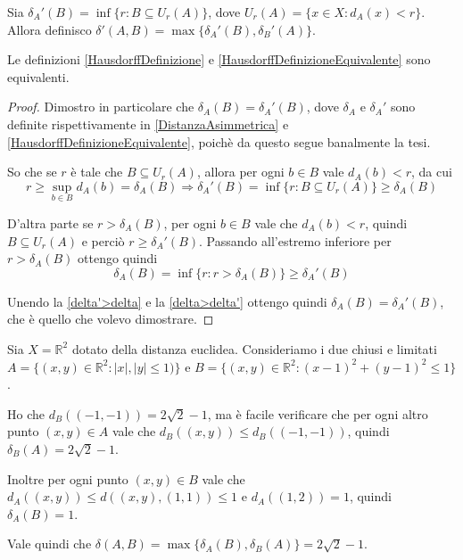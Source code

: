 \begin{definition} \label{HausdorffDefinizioneEquivalente}
	Sia $\delta_A'(B)=\inf\{r:B\subseteq U_r(A)\}$, dove $U_r(A)=\{x\in X : d_A(x)< r \}$. Allora definisco $\delta'(A,B)=\max\{\delta_A'(B),\delta_B'(A)\}$.
\end{definition}

\begin{theorem}
	Le definizioni \cref{HausdorffDefinizione} e \cref{HausdorffDefinizioneEquivalente} sono equivalenti.
\end{theorem}
\begin{proof}
	Dimostro in particolare che $\delta_A(B)=\delta_A'(B)$, dove $\delta_A$ e $\delta_A'$ sono definite rispettivamente in \cref{DistanzaAsimmetrica} e \cref{HausdorffDefinizioneEquivalente}, poichè da questo segue banalmente la tesi.
	
	So che se $r$ è tale che $B\subseteq U_r(A)$, allora per ogni $b\in B$ vale $d_A(b)<r$, da cui
	\begin{equation}\label{delta'>delta}
		r\ge \sup_{b\in B} d_A(b)=\delta_A(B) \Longrightarrow \delta_A'(B)=\inf\{r:B\subseteq U_r(A) \}\ge \delta_A(B)
	\end{equation}
	
	D'altra parte se $r>\delta_A(B)$, per ogni $b\in B$ vale che $d_A(b)<r$, quindi $B\subseteq U_r(A)$ e perciò $r\ge \delta_A'(B)$. Passando all'estremo inferiore per $r>\delta_A(B)$ ottengo quindi
	\begin{equation}\label{delta>delta'}
		\delta_A(B)=\inf\{r:r>\delta_A(B)\}\ge \delta_A'(B)
	\end{equation}
	
	Unendo la \cref{delta'>delta} e la \cref{delta>delta'} ottengo quindi $\delta_A(B)=\delta_A'(B)$, che è quello che volevo dimostrare.
\end{proof}

\begin{example}
	Sia $X=\mathbb{R}^2$ dotato della distanza euclidea. Consideriamo i due chiusi e limitati $A=\{(x,y)\in\mathbb{R}^2:|x|,|y|\le 1)\}$ e $B=\{(x,y)\in\mathbb{R}^2:(x-1)^2+(y-1)^2\le 1\}$.
	
	Ho che $d_B((-1,-1))=2\sqrt{2}-1$, ma è facile verificare che per ogni altro punto $(x,y)\in A$ vale che $d_B((x,y))\le d_B((-1,-1))$, quindi $\delta_B(A)=2\sqrt{2}-1$.
	
	Inoltre per ogni punto $(x,y)\in B$ vale che $d_A((x,y))\le d((x,y),(1,1))\le 1$ e $d_A((1,2))=1$, quindi $\delta_A(B)=1$.
	
	Vale quindi che $\delta(A,B)=\max\{ \delta_A(B),\delta_B(A) \}=2\sqrt{2}-1$.
\end{example}


